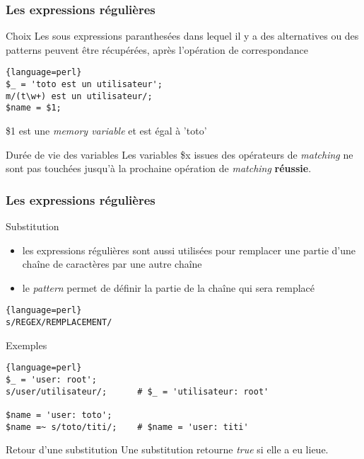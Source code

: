 \begin{frame}[fragile]
  \frametitle{Les expressions régulières}

  \begin{block}{Choix}
    Les sous expressions paranthesées dans lequel il y a des alternatives ou
    des patterns peuvent être récupérées, après l'opération de correspondance
    \begin{lstlisting}{language=perl}
$_ = 'toto est un utilisateur';
m/(t\w+) est un utilisateur/;
$name = $1;
    \end{lstlisting}
    \$1 est une \textit{memory variable} et est égal à 'toto'
  \end{block}
  \begin{alertblock}{Durée de vie des variables}
    Les variables \$x issues des opérateurs de \textit{matching} ne sont pas
    touchées jusqu'à la prochaine opération de \textit{matching}
    \textbf{réussie}.
  \end{alertblock}

\end{frame}

\begin{frame}[fragile]
  \frametitle{Les expressions régulières}

  \begin{block}{Substitution}
    \begin{itemize}
    \item les expressions régulières sont aussi utilisées pour remplacer
      une partie d'une chaîne de caractères par une autre chaîne
    \item le \textit{pattern} permet de définir la partie de la chaîne
      qui sera remplacé
    \end{itemize}
    \begin{lstlisting}{language=perl}
s/REGEX/REMPLACEMENT/
    \end{lstlisting}
  \end{block}

  \begin{exampleblock}{Exemples}
    \begin{lstlisting}{language=perl}
$_ = 'user: root';
s/user/utilisateur/;      # $_ = 'utilisateur: root'

$name = 'user: toto';
$name =~ s/toto/titi/;    # $name = 'user: titi'
    \end{lstlisting}
  \end{exampleblock}
  \begin{alertblock}{Retour d'une substitution}
    Une substitution retourne \textit{true} si elle a eu lieue.
  \end{alertblock}

\end{frame}

